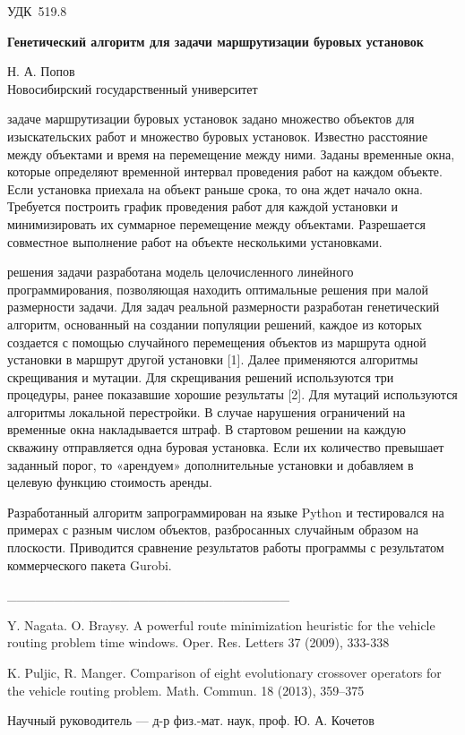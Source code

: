 \documentclass[a5paper,10pt]{extreport}
\def\udcK#1{\noindent УДК~{#1}}
\def\titleK#1{\begin{center}{\textbf {#1}}\end{center}}
\def\authorK#1{\begin{center}{#1}\end{center}}
\def\advisorK#1{Научный руководитель — {#1}}
\newenvironment{bibliographyK}{\footnotesize \begin{enumerate}[label={[\arabic*]}]}{\end{enumerate}}
\theoremstyle{definition}
\theoremstyle{definition}
\theoremstyle{definition}
\begin{document}
\udcK{519.8}
\titleK{Генетический алгоритм для задачи маршрутизации буровых установок}
\authorK{Н. А. Попов\\
Новосибирский государственный университет}
\parindent=0.5cm

 задаче маршрутизации буровых установок задано множество объектов для изыскательских работ и множество буровых установок. Известно расстояние между объектами и время на перемещение между ними. Заданы временные окна, которые определяют временной интервал проведения работ на каждом объекте. Если установка приехала на объект раньше срока, то она ждет начало окна. Требуется построить график проведения работ для каждой установки и минимизировать их суммарное перемещение между объектами. Разрешается совместное выполнение работ на объекте несколькими установками.

\parindent=0.5cm

 решения задачи разработана модель целочисленного линейного программирования, позволяющая находить оптимальные решения при малой размерности задачи. Для задач реальной размерности разработан генетический алгоритм, основанный на создании популяции решений, каждое из которых создается с помощью случайного перемещения объектов из маршрута одной установки в маршрут другой установки [1]. Далее применяются алгоритмы скрещивания и мутации. Для скрещивания решений используются три процедуры, ранее показавшие хорошие результаты [2]. Для мутаций используются алгоритмы локальной перестройки. В случае нарушения ограничений на временные окна накладывается штраф. В стартовом решении на каждую скважину отправляется одна буровая установка. Если их количество превышает заданный порог, то «арендуем» дополнительные установки и добавляем в целевую функцию стоимость аренды.

\parindent=0.5cm
Разработанный алгоритм запрограммирован на языке Python и тестировался на примерах с разным числом объектов, разбросанных случайным образом на плоскости. Приводится сравнение результатов работы программы с результатом коммерческого пакета Gurobi.

\noindent\_\_\_\_\_\_\_\_\_\_\_\_\_\_\_\_\_\_\_\_\_\_\_\_\_\_\_\_\_\_
\begin{bibliographyK}
\item \label{reference1}
Y. Nagata. O. Braysy. A powerful route minimization heuristic for the vehicle routing problem time windows. Oper. Res. Letters 37 (2009), 333-338
\item \label{reference2}
K. Puljic, R. Manger. Comparison of eight evolutionary crossover operators for the vehicle routing problem. Math. Commun. 18 (2013), 359–375
\end{bibliographyK}
\advisorK{д-р физ.-мат. наук, проф. Ю. А. Кочетов}
\end{document}
